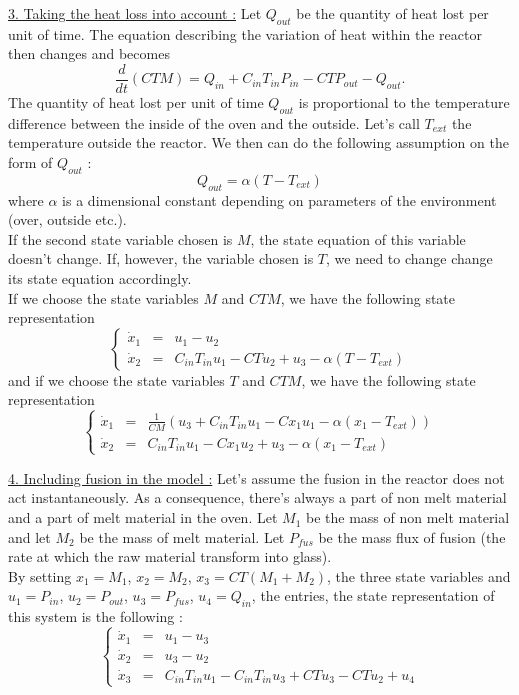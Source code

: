 \underline{3. Taking the heat loss into account :}
Let $Q_{out}$ be the quantity of heat lost per unit of time. The equation describing the variation of heat within the reactor then changes and becomes $$\frac{d}{dt}(CTM) = Q_{in} + C_{in}T_{in}P_{in} - CTP_{out} - Q_{out}.$$
The quantity of heat lost per unit of time $Q_{out}$ is proportional to the temperature difference between the inside of the oven and the outside. Let's call $T_{ext}$ the temperature outside the reactor. We then can do the following assumption on the form of $Q_{out}$ : $$Q_{out} = \alpha(T-T_{ext})$$ where $\alpha$ is a dimensional constant depending on parameters of the environment (over, outside etc.).\\
If the second state variable chosen is $M$, the state equation of this variable doesn't change. If, however, the variable chosen is $T$, we need to change change its state equation accordingly.\\
If we choose the state variables $M$ and $CTM$, we have the following state representation
$$\left\{\begin{array}{ccl}
\dot{x}_1 & = & u_1 - u_2 \\
\dot{x}_2 & = & C_{in}T_{in}u_1 - CTu_2 + u_3 - \alpha(T-T_{ext})
\end{array}\right.$$
and if we choose the state variables $T$ and $CTM$, we have the following state representation
$$\left\{\begin{array}{ccl}
\dot{x}_1 & = & \frac{1}{CM}(u_3 + C_{in}T_{in}u_1 - Cx_1u_1 - \alpha(x_1-T_{ext})) \\
\dot{x}_2 & = & C_{in}T_{in}u_1 - Cx_1u_2 + u_3 - \alpha(x_1-T_{ext})
\end{array}\right.$$

\underline{4. Including fusion in the model :}
Let's assume the fusion in the reactor does not act instantaneously. As a consequence, there's always a part of non melt material and a part of melt material in the oven. Let $M_1$ be the mass of non melt material and let $M_2$ be the mass of melt material. Let $P_{fus}$ be the mass flux of fusion (the rate at which the raw material transform into glass).\\
By setting $x_1 = M_1$, $x_2 = M_2$, $x_3 = CT(M_1+M_2)$, the three state variables and $u_1 = P_{in}$, $u_2 = P_{out}$, $u_3 = P_{fus}$, $u_4 = Q_{in}$, the entries, the state representation of this system is the following :
$$\left\{\begin{array}{ccl}
\dot{x}_1 & = & u_1 - u_3\\
\dot{x}_2 & = & u_3 - u_2\\
\dot{x}_3 & = & C_{in}T_{in}u_1 - C_{in}T_{in}u_3 + CTu_3 - CTu_2 + u_4
\end{array}\right.$$

